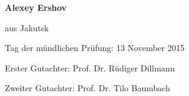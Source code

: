 \begin{titlepage}
\begin{center}
  {\Large \textbf{Alexey Ershov}} \\
  
  \vspace{15pt} 
  
  {\large aus Jakutsk}
 
  \vspace{40pt}
  
   
\end{center}

\vspace{100pt} 

{Tag der m\"undlichen Pr\"ufung: 13 November 2015}

\vspace{15pt} 
  
{Erster Gutachter: Prof. Dr. R\"udiger Dillmann}

\vspace{15pt} 
    
{Zweiter Gutachter: Prof. Dr. Tilo  Baumbach}

\end{titlepage}
